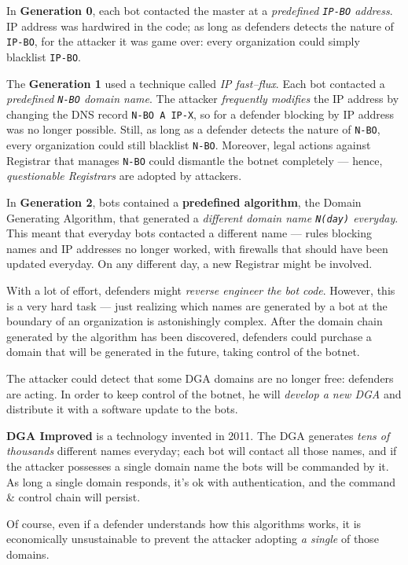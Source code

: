 \documentclass[10pt]{\classname}
\begin{document}
In \textbf{Generation 0}, each bot contacted the master at a \emph{predefined
\texttt{IP-BO} address}. IP address was hardwired in the code; as long as
defenders detects the nature of \texttt{IP-BO}, for the attacker it was game
over: every organization could simply blacklist \texttt{IP-BO}.

The \textbf{Generation 1} used a technique called \emph{IP fast--flux}. Each
bot contacted a \emph{predefined \texttt{N-BO} domain name}. The attacker
\emph{frequently modifies} the IP address by changing the DNS record
\texttt{N-BO A IP-X}, so for a defender blocking by IP address was no longer
possible. Still, as long as a defender detects the nature of \texttt{N-BO}, every
organization could still blacklist \texttt{N-BO}. Moreover, legal actions
against Registrar that manages \texttt{N-BO} could dismantle the botnet
completely --- hence, \emph{questionable Registrars} are adopted by attackers.

In \textbf{Generation 2}, bots contained a \textbf{predefined algorithm}, the
Domain Generating Algorithm, that generated a \emph{different domain name
\texttt{N(day)} everyday}. This meant that everyday bots contacted a different
name --- rules blocking names and IP addresses no longer worked, with firewalls
that should have been updated everyday. On any different day, a new Registrar
might be involved.

With a lot of effort, defenders might \emph{reverse engineer the bot code}.
However, this is a very hard task --- just realizing which names are generated
by a bot at the boundary of an organization is astonishingly complex. After the
domain chain generated by the algorithm has been discovered, defenders could
purchase a domain that will be generated in the future, taking control of the
botnet.

The attacker could detect that some DGA domains are no longer free: defenders
are acting. In order to keep control of the botnet, he will \emph{develop a new
DGA} and distribute it with a software update to the bots.

\textbf{DGA Improved} is a technology invented in 2011. The DGA generates
\emph{tens of thousands} different names everyday; each bot will contact all
those names, and if the attacker possesses a single domain name the bots will
be commanded by it. As long a single domain responds, it's ok with
authentication, and the command \& control chain will persist.

Of course, even if a defender understands how this algorithms works, it is
economically unsustainable to prevent the attacker adopting \emph{a single}
of those domains.
\end{document}
